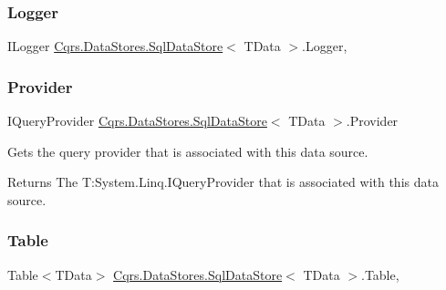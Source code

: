 \subsubsection{\texorpdfstring{Logger}{Logger}}
{\footnotesize\ttfamily I\+Logger \hyperlink{classCqrs_1_1DataStores_1_1SqlDataStore}{Cqrs.\+Data\+Stores.\+Sql\+Data\+Store}$<$ T\+Data $>$.Logger\hspace{0.3cm}{\ttfamily [get]}, {\ttfamily [protected]}}

\mbox{\label{classCqrs_1_1DataStores_1_1SqlDataStore_aec0093c6fe2adc41899c2418a0e324d9}} 
\subsubsection{\texorpdfstring{Provider}{Provider}}
{\footnotesize\ttfamily I\+Query\+Provider \hyperlink{classCqrs_1_1DataStores_1_1SqlDataStore}{Cqrs.\+Data\+Stores.\+Sql\+Data\+Store}$<$ T\+Data $>$.Provider\hspace{0.3cm}{\ttfamily [get]}}



Gets the query provider that is associated with this data source. 

\begin{DoxyReturn}{Returns}
The T\+:\+System.\+Linq.\+I\+Query\+Provider that is associated with this data source. 
\end{DoxyReturn}
\mbox{\label{classCqrs_1_1DataStores_1_1SqlDataStore_abcd0a88f984a275880f402baadaae2c7}} 
\subsubsection{\texorpdfstring{Table}{Table}}
{\footnotesize\ttfamily Table$<$T\+Data$>$ \hyperlink{classCqrs_1_1DataStores_1_1SqlDataStore}{Cqrs.\+Data\+Stores.\+Sql\+Data\+Store}$<$ T\+Data $>$.Table\hspace{0.3cm}{\ttfamily [get]}, {\ttfamily [protected]}}

